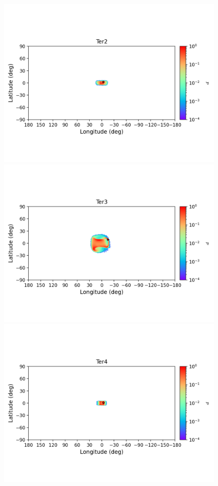 \begin{figure}
        \includegraphics[clip=true, trim = 0mm 20mm 0mm 10mm, width=1\columnwidth]{images/error_plots_Ter2.png}
        \includegraphics[clip=true, trim = 0mm 20mm 0mm 10mm, width=1\columnwidth]{images/error_plots_Ter3.png}
        \includegraphics[clip=true, trim = 0mm 20mm 0mm 10mm, width=1\columnwidth]{images/error_plots_Ter4.png}

\end{figure}
